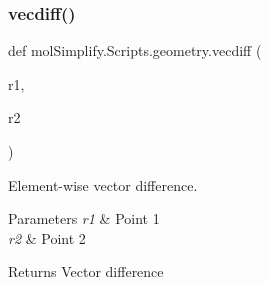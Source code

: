\subsubsection{\texorpdfstring{vecdiff()}{vecdiff()}}
{\footnotesize\ttfamily def mol\+Simplify.\+Scripts.\+geometry.\+vecdiff (\begin{DoxyParamCaption}\item[{}]{r1,  }\item[{}]{r2 }\end{DoxyParamCaption})}



Element-\/wise vector difference. 


\begin{DoxyParams}{Parameters}
{\em r1} & Point 1 \\
\hline
{\em r2} & Point 2 \\
\hline
\end{DoxyParams}
\begin{DoxyReturn}{Returns}
Vector difference 
\end{DoxyReturn}
